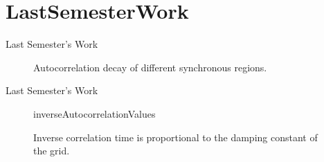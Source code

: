 \section[Last Semester's Work]{LastSemesterWork}
\label{sec:lastSemesterWork}

\begin{frame}{Last Semester's Work}	
	\begin{figure}[ht]
		\centering
		\caption{Autocorrelation decay of different synchronous regions.}
		\label{fig:comp5}
	\end{figure}
\end{frame}

\begin{frame}{Last Semester's Work}
	\begin{figure}
		\centering
		{inverseAutocorrelationValues}
		\label{tab:invAutocorr}
		\caption{Inverse correlation time is proportional to the damping constant of the grid.}
	\end{figure}	
\end{frame}

